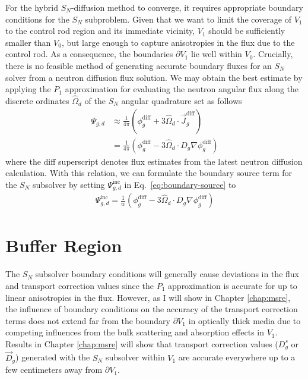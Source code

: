 For the hybrid $S_N$-diffusion method to converge, it requires appropriate boundary conditions for
the $S_N$ subproblem.
Given that we want to limit the coverage of $V_1$ to the control rod region and its
immediate vicinity, $V_1$ should be sufficiently smaller than $V_0$, but large enough to capture
anisotropies in the flux due to the control rod. As a consequence, the boundaries $\partial V_1$ 
lie well within $V_0$. Crucially, there is no feasible method of generating
accurate boundary fluxes for an $S_N$ solver from a neutron diffusion flux solution. We may obtain
the best estimate by applying the $P_1$ approximation for evaluating the neutron angular flux along
the discrete ordinates $\hat{\Omega}_d$ of the $S_N$ angular quadrature set as follows
%
\begin{align}
  \Psi_{g,d} &\approx \frac{1}{4\pi}\left(\phi^\text{diff}_g+3\hat{\Omega}_d\cdot
  \vec{J}^\text{diff}_g\right) \nonumber \\
  &=\frac{1}{4\pi}\left(\phi^\text{diff}_g-3\hat{\Omega}_d\cdot D_g\nabla\phi^\text{diff}_g\right)
\end{align}
%
where the diff superscript denotes flux estimates from the latest neutron diffusion calculation.
With this relation, we can formulate the boundary source term for the $S_N$ subsolver by setting
$\Psi^\text{inc}_{g,d}$ in Eq.\ \ref{eq:boundary-source} to
%
\begin{gather}
  \Psi^\text{inc}_{g,d} = \frac{1}{w}
  \left(\phi^\text{diff}_g-3\hat{\Omega}_d\cdot D_g\nabla\phi^\text{diff}_g\right)
\end{gather}

\section{Buffer Region} \label{sec:buffer-region}

The $S_N$ subsolver boundary conditions will generally cause deviations
in the flux and transport correction values since the $P_1$ approximation is accurate for up to
linear anisotropies in the flux. However, as I will show in Chapter \ref{chap:msre},
the influence of boundary conditions on the accuracy of
the transport correction terms does not extend far from the boundary $\partial V_1$ in optically
thick media due to competing influences from the bulk scattering and absorption effects in $V_1$.
Results in Chapter \ref{chap:msre} will show that transport correction values
($D^s_g$ or $\vec{D}_g$) generated with the $S_N$ subsolver within $V_1$ are accurate everywhere up
to a few centimeters away from $\partial V_1$.

